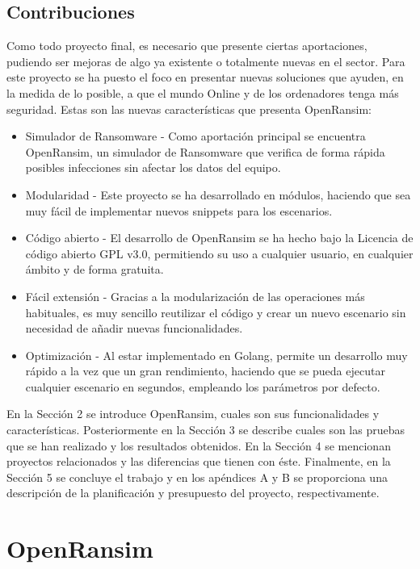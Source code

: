 \documentclass[a4paper,12pt]{article}
\begin{document}
\subsection{Contribuciones}
Como todo proyecto final, es necesario que presente ciertas aportaciones, pudiendo ser mejoras de algo ya existente o totalmente nuevas en el sector. Para este proyecto se ha puesto el foco en presentar nuevas soluciones que ayuden, en la medida de lo posible, a que el mundo Online y de los ordenadores tenga más seguridad. Estas son las nuevas características que presenta OpenRansim: 
\begin{itemize}
	\item Simulador de Ransomware - Como aportación principal se encuentra OpenRansim, un simulador de Ransomware que verifica de forma rápida posibles infecciones sin afectar los datos del equipo.
	\item Modularidad - Este proyecto se ha desarrollado en módulos, haciendo que sea muy fácil de implementar nuevos snippets para los escenarios.
	\item Código abierto - El desarrollo de OpenRansim se ha hecho bajo la Licencia de código abierto GPL v3.0, permitiendo su uso a cualquier usuario, en cualquier ámbito y de forma gratuita.
	\item Fácil extensión - Gracias a la modularización de las operaciones más habituales, es muy sencillo reutilizar el código y crear un nuevo escenario sin necesidad de añadir nuevas funcionalidades.
	\item Optimización - Al estar implementado en Golang, permite un desarrollo muy rápido a la vez que un gran rendimiento, haciendo que se pueda ejecutar cualquier escenario en segundos, empleando los parámetros por defecto.
\end{itemize}
En la Sección 2 se introduce OpenRansim, cuales son sus funcionalidades y características. Posteriormente en la Sección 3 se describe cuales son las pruebas que se han realizado y los resultados obtenidos. En la Sección 4 se mencionan proyectos relacionados y las diferencias que tienen con éste. Finalmente, en la Sección 5 se concluye el trabajo y en los apéndices A y B se proporciona una descripción de la planificación y presupuesto del proyecto, respectivamente.
\section{OpenRansim}
\end{document}
